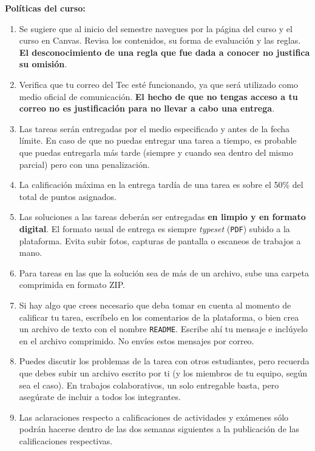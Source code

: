 \documentclass[12pt, letterpaper, oneside]{article}
\begin{document}
  \noindent\textbf{Políticas del curso:}  
  \begin{enumerate}
  \item Se sugiere que al inicio del semestre navegues por la página del curso y el curso en Canvas. Revisa los contenidos, su forma de evaluación y las reglas. \textbf{El desconocimiento de una regla que fue dada a conocer no justifica su omisión}.
  \item Verifica que tu correo del Tec esté funcionando, ya que será utilizado como medio oficial de comunicación. \textbf{El hecho de que no tengas acceso a tu correo no es justificación para no llevar a cabo una entrega}.
  \item Las tareas serán entregadas por el medio especificado y antes de la fecha límite. En caso de que no puedas entregar una tarea a tiempo, es probable que puedas entregarla más tarde (siempre y cuando sea dentro del mismo parcial) pero con una penalización.
  \item La calificación máxima en la entrega tardía de una tarea es sobre el 50\% del total de puntos asignados.
  \item Las soluciones a las tareas deberán ser entregadas \textbf{en limpio y en formato digital}. El formato usual de entrega es siempre \textit{typeset} (\texttt{PDF}) subido a la plataforma. Evita subir fotos, capturas de pantalla o escaneos de trabajos a mano.
  \item Para tareas en las que la solución sea de más de un archivo, sube una carpeta comprimida en formato ZIP.
  \item Si hay algo que crees necesario que deba tomar en cuenta al momento de calificar tu tarea, escríbelo en los comentarios de la plataforma, o bien crea un archivo de texto con el nombre \texttt{README}. Escribe ahí tu mensaje e inclúyelo en el archivo comprimido. No envíes estos mensajes por correo.
  \item Puedes discutir los problemas de la tarea con otros estudiantes, pero recuerda que debes subir un archivo escrito por ti (y los miembros de tu equipo, según sea el caso). En trabajos colaborativos, un solo entregable basta, pero asegúrate de incluir a todos los integrantes.
  \item Las aclaraciones respecto a calificaciones de actividades y exámenes sólo podrán hacerse dentro de las dos semanas siguientes a la publicación de las calificaciones respectivas.

\end{enumerate}
\end{document}
